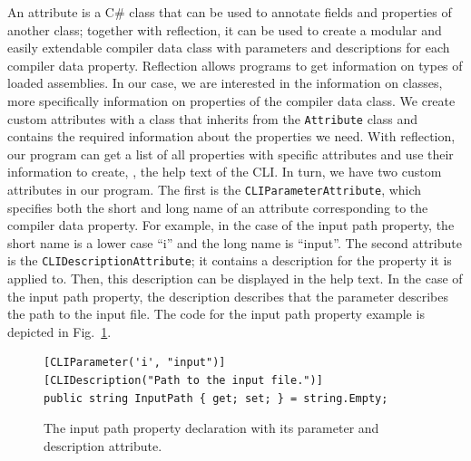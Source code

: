 An attribute is a C\# class that can be used to annotate fields and properties of another class; together with reflection, it can be used to create a modular and easily extendable compiler data class with parameters and descriptions for each compiler data property. Reflection allows programs to get information on types of loaded assemblies. In our case, we are interested in the information on classes, more specifically information on properties of the compiler data class. We create custom attributes with a class that inherits from the \texttt{Attribute} class and contains the required information about the properties we need. With reflection, our program can get a list of all properties with specific attributes and use their information to create, \eg, the help text of the CLI. In turn, we have two custom attributes in our program. The first is the \texttt{CLIParameterAttribute}, which specifies both the short and long name of an attribute corresponding to the compiler data property. For example, in the case of the input path property, the short name is a lower case ``i'' and the long name is ``input''. The second attribute is the \texttt{CLIDescriptionAttribute}; it contains a description for the property it is applied to. Then, this description can be displayed in the help text. In the case of the input path property, the description describes that the parameter describes the path to the input file. The code for the input path property example is depicted in Fig.~\ref{fig:implementation_inputPathAttribute}.

\begin{figure}[htp]
    \centering
    \begin{lstlisting}[style=CSharp]
[CLIParameter('i', "input")]
[CLIDescription("Path to the input file.")]
public string InputPath { get; set; } = string.Empty;
    \end{lstlisting}
    \caption{The input path property declaration with its parameter and description attribute.}
    \label{fig:implementation_inputPathAttribute}
\end{figure}

